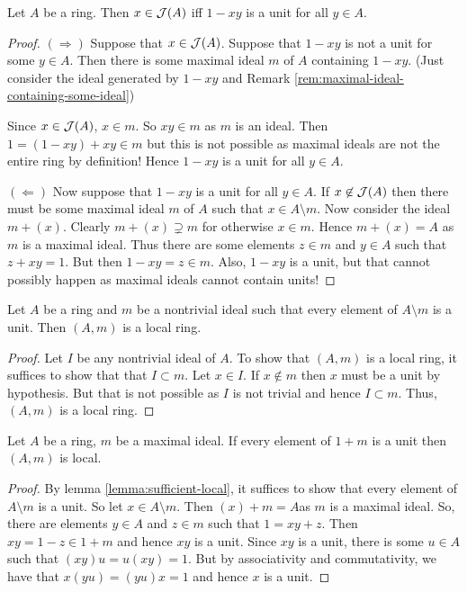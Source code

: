 \begin{lemma}
    Let $A$ be a ring. Then $x\in {\cal J} (A)$ iff $1-xy$ is a unit for all $y\in A$.
    \label{lemma:equiv-Jacobson}
\end{lemma}
\begin{proof}
    $\left( \Longrightarrow \right)$ Suppose that $x \in {\cal J}(A)$. Suppose that $1-xy$ is not a unit for some $y\in A$. Then there is some maximal ideal $m$ of $A$ containing $1-xy$. (Just consider the ideal generated by $1-xy$ and Remark \ref{rem:maximal-ideal-containing-some-ideal})

    Since $x\in {\cal J}(A)$, $x\in m$. So $xy\in m$ as $m$ is an ideal. Then $1= (1-xy)+xy \in m$ but this is not possible as maximal ideals are not the entire ring by definition! Hence $1-xy $ is a unit for all $y\in A$.

    $\left( \Longleftarrow \right)$ Now suppose that $1-xy$ is a unit for all $y\in A$. If $x\not \in {\cal J} (A)$ then there must be some maximal ideal $m$ of $A$ such that $x\in A\setminus m$. Now consider the ideal $m + (x)$. Clearly $m + (x) \supsetneq m$ for otherwise $x\in m$. Hence $m+ (x)=A$ as $m$ is a maximal ideal. Thus there are some elements $z\in m$ and $y \in A$ such that $z+xy =1$. But then $1-xy = z \in m$. Also, $1-xy$ is a unit, but that cannot possibly happen as maximal ideals cannot contain units!
\end{proof}

\begin{lemma}
    Let $A$ be a ring and $m$ be a nontrivial ideal such that every element of $A\setminus m$ is a unit. Then $\left( A, m \right)$ is a local ring.
    \label{lemma:sufficient-local}
\end{lemma}
\begin{proof}
    Let $I$ be any nontrivial ideal of $A$. To show that $\left( A,m \right)$ is a local ring, it suffices to show that that $I \subset m$. Let $x\in I$. If $x\not \in m$ then $x$ must be a unit by hypothesis. But that is not possible as $I$ is not trivial and hence $I \subset m$. Thus, $(A, m)$ is a local ring.
\end{proof}

\begin{lemma}
    Let $A$ be a ring, $m$ be a maximal ideal. If every element of $1+m$ is a unit then $(A,m)$ is local.
    \label{lemma:sufficient-local-2}
\end{lemma}
\begin{proof}
    By lemma \ref{lemma:sufficient-local}, it suffices to show that every element of $A\setminus m$ is a unit. So let $x\in A \setminus m$. Then $\left( x \right) + m = A $as $m$ is a maximal ideal. So, there are elements $y\in A$ and $z\in m$ such that $1=xy+z$. Then $xy = 1-z \in 1+m$ and hence $xy$ is a unit. Since $xy$ is a unit, there is some $u \in A$ such that $(xy)u= u(xy)=1$. But by associativity and commutativity, we have that $x(yu)=(yu)x=1$ and hence $x$ is a unit.
\end{proof} 

